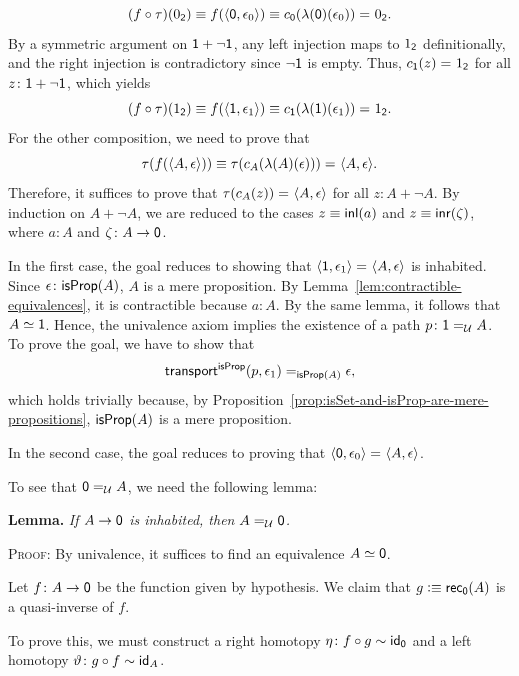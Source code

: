 \begin{solution}
    \[
        (f\circ\tau)(0_{\mathsf{2}})
            \equiv f(\langle\mathsf{0},\epsilon_0\rangle)
            \equiv c_{\mathsf{0}}(\lambda(\mathsf{0})(\epsilon_0))
            \mathrel{=_{}} 0_{\mathsf{2}}.
    \]
    By a symmetric argument on $\mathsf{1}+\neg\mathsf{1}$, any left injection maps to $1_{\mathsf{2}}$ definitionally, and the right injection is contradictory since $\neg\mathsf{1}$ is empty. Thus, $c_{\mathsf{1}}(z)\mathrel{=_{}}1_{\mathsf{2}}$ for all $z\colon\fun1+\neg\fun1$, which yields
    \[
        (f\circ\tau)(1_{\mathsf{2}})
            \equiv f(\langle\mathsf{1},\epsilon_1\rangle)
            \equiv c_{\mathsf{1}}(\lambda(\mathsf{1})(\epsilon_1))
            \mathrel{=_{}} 1_{\mathsf{2}}.
    \]
    For the other composition, we need to prove that
    \[
        \tau(f(\langle A,\epsilon\rangle))
            \equiv\tau(c_A(\lambda(A)(\epsilon)))
            \mathrel{=_{}}\langle A,\epsilon\rangle.
    \]
    Therefore, it suffices to prove that $\tau(c_A(z))\mathrel{=_{}}\langle A,\epsilon\rangle$ for all $z\colon A+\neg A$. By induction on $A+\neg A$, we are reduced to the cases $z\equiv\mathsf{inl}(a)$ and $z\equiv\mathsf{inr}(\zeta)$, where $a\colon A$ and $\zeta\colon A\to\fun0$.

    In the first case, the goal reduces to showing that $\langle\mathsf{1},\epsilon_1\rangle\mathrel{=_{}}\langle A,\epsilon\rangle$ is inhabited. Since $\epsilon\colon\fun{isProp}(A)$, $A$ is a mere proposition. By Lemma~\ref{lem:contractible-equivalences}, it is contractible because $a\colon A$. By the same lemma, it follows that $A\simeq\mathsf{1}$. Hence, the univalence axiom implies the existence of a path $p\colon\fun1\eq\univ A$. To prove the goal, we have to show that
    \[
        \mathsf{transport}^{\mathsf{isProp}}(p,\epsilon_1)
            \mathrel{=_{\mathsf{isProp}(A)}}\epsilon,
    \]
    which holds trivially because, by Proposition~\ref{prop:isSet-and-isProp-are-mere-propositions}, $\mathsf{isProp}(A)$ is a mere proposition.

    In the second case, the goal reduces to proving that $\langle\mathsf{0},\epsilon_0\rangle\mathrel{=_{}}\langle A,\epsilon\rangle$.

    To see that $\mathsf{0}\mathrel{=_{\mathcal U}} A$, we need the following lemma:

    \medskip

    \textbf{Lemma.} \textit{If $A\to\mathsf{0}$ is inhabited, then $A\mathrel{=_{\mathcal U}}\mathsf{0}$.}
    
    \textsc{Proof:} By univalence, it suffices to find an equivalence $A\simeq\mathsf{0}$.
    
    Let $f\colon A\to\fun0$ be the function given by hypothesis. We claim that $g\mathrel{\vcentcolon}\equiv\mathsf{rec}_{\mathsf{0}}(A)$ is a quasi-inverse of $f$.

    To prove this, we must construct a right homotopy $\eta\colon f\circ g\sim\id_{\fun0}$ and a left homotopy $\vartheta\colon g\circ f\sim\id_A$.


\end{solution}
